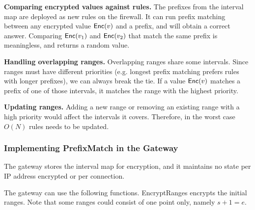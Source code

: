 

\noindent \textbf{Comparing encrypted values against rules.}
The prefixes from the interval map are deployed as new rules on the firewall. It can run prefix matching between any encrypted value $\mathsf{Enc}(v)$ and a prefix, and will obtain a correct answer. Comparing $\mathsf{Enc}(v_1)$ and $\mathsf{Enc}(v_2)$ that match the same prefix is meaningless, and returns a random value.

\noindent \textbf{Handling overlapping ranges.} 
Overlapping ranges share some intervals. Since ranges must have different priorities (e.g. longest prefix matching prefers rules with longer prefixes), we can always break the tie. If a value $\mathsf{Enc}(v)$ matches a prefix of one of those intervals, it matches the range with the highest priority.

\noindent \textbf{Updating ranges.}
Adding a new range or removing an existing range with a high priority would affect the intervals it covers. Therefore, in the worst case $O(N)$ rules needs to be updated. 

\subsubsection{Implementing PrefixMatch in the Gateway}
\label{sec:tree}

The gateway stores the interval map for encryption, and it maintains no state per IP address encrypted or per connection.

The gateway can use the following functions. EncryptRanges encrypts the initial ranges. Note that some ranges could consist of
one point only, namely $s + 1 = e$. 


